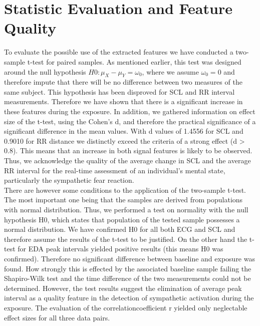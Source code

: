 \section{Statistic Evaluation and Feature Quality}

To evaluate the possible use of the extracted features we have conducted a two-sample t-test for paired samples. As mentioned earlier, this test was designed around the null hypothesis $H0: \mu_{X}-\mu_{Y} = \omega_{0}$, where we assume $\omega_{0}=0$ and therefore impute that there will be no difference between two measures of the same subject. This hypothesis has been disproved for SCL and RR interval measurements. Therefore we have shown that there is a significant increase in these features during the exposure. In addition, we gathered information on effect size of the t-test, using the Cohen's d, and therefore the practical significance of a significant difference in the mean values. With d values of 1.4556 for SCL and 0.9010 for RR distance we distinctly exceed the criteria of a strong effect (d > 0.8). This means that an increase in both signal features is likely to be observed. Thus, we acknowledge the quality of the average change in SCL and the average RR interval for the real-time assessment of an individual's mental state, particularly the sympathetic fear reaction.\\
There are however some conditions to the application of the two-sample t-test. The most important one being that the samples are derived from populations with normal distribution. Thus, we performed a test on normality with the null hypothesis H0, which states that population of the tested sample possesses a normal distribution. We have confirmed H0 for all both ECG and SCL and therefore assume the results of the t-test to be justified. On the other hand the t-test for EDA peak intervals yielded positive results (this means H0 was confirmed). Therefore no significant difference between baseline and exposure was found. How strongly this is effected by the associated baseline sample failing the Shapiro-Wilk test and the time difference of the two measurements could not be determined. However, the test results suggest the elimination of average peak interval as a quality feature in the detection of sympathetic activation during the exposure. 
The evaluation of the correlationcoefficient r yielded only neglectable effect sizes for all three data pairs.
 